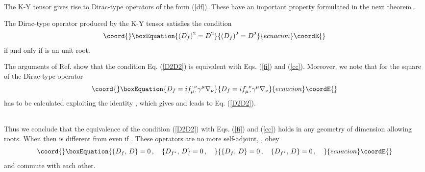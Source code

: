 \documentclass[a4paper,12pt]{article}
\begin{document}
The K-Y tensor gives rise to  Dirac-type operators of the form 
(\ref{df}). These have  an important property formulated in the next theorem 
\cite{K1}.
\begin{theor}\label{D2D}
The Dirac-type operator \coordHE{} produced by the K-Y tensor \coordHE{}  
satisfies the  condition  
\begin{equation}\coord{}\boxEquation{\label{D2D2}
(D_{f})^2=D^2 
}{(D_{f})^2=D^2 
}{ecuacion}\coordE{}\end{equation}
if and only if \coordHE{} is an unit root. 
\end{theor}
\begin{demo}
The arguments of Ref. \cite{K1} show that the condition Eq. (\ref{D2D2}) is 
equivalent  with Eqs. (\ref{fi}) and (\ref{cc}). 
Moreover, we note that for \coordHE{}  the square of 
the Dirac-type operator
\begin{equation}\coord{}\boxEquation{\label{Dirf}
D_f=if_{\mu\,\cdot}^{\cdot\,\nu}\gamma^{\mu}\nabla_{\nu}
}{D_f=if_{\mu\,\cdot}^{\cdot\,\nu}\gamma^{\mu}\nabla_{\nu}
}{ecuacion}\coordE{}\end{equation}
has to be calculated exploiting  the identity 
\coordHE{},
which gives  
\coordHE{} and leads to Eq. (\ref{D2D2}). 
\end{demo}\\
Thus we  conclude that the equivalence of the condition (\ref{D2D2}) 
with Eqs. (\ref{fi}) and (\ref{cc}) holds in any geometry of dimension \coordHE{} 
allowing roots. When \coordHE{} then \coordHE{} is different from \coordHE{} even 
if \coordHE{}. These operators are no more self-adjoint, 
\coordHE{}, obey
\begin{equation}\coord{}\boxEquation{\label{DDO}
\left\{ D_{f},\,D\right\}=0\,,\quad
\left\{ D_{f^*},\,D\right\}=0\,,\quad
}{\left\{ D_{f},\,D\right\}=0\,,\quad
\left\{ D_{f^*},\,D\right\}=0\,,\quad
}{ecuacion}\coordE{}\end{equation}
and commute with each other.  
\end{document}
